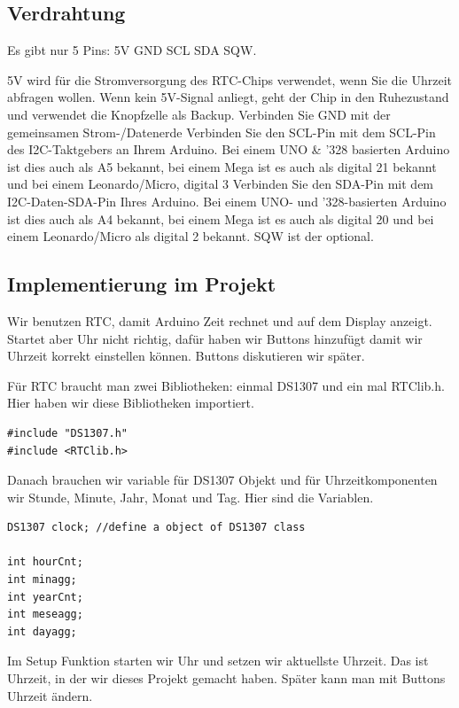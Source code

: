 \documentclass[conference]{IEEEtran}
\begin{document}
\subsection{Verdrahtung}

Es gibt nur 5 Pins: 5V GND SCL SDA SQW.

5V wird für die Stromversorgung des RTC-Chips verwendet, wenn Sie die Uhrzeit abfragen wollen. Wenn kein 5V-Signal anliegt, geht der Chip in den Ruhezustand und verwendet die Knopfzelle als Backup.
Verbinden Sie GND mit der gemeinsamen Strom-/Datenerde
Verbinden Sie den SCL-Pin mit dem SCL-Pin des I2C-Taktgebers an Ihrem Arduino. Bei einem UNO \& '328 basierten Arduino ist dies auch als A5 bekannt, bei einem Mega ist es auch als digital 21 bekannt und bei einem Leonardo/Micro, digital 3
Verbinden Sie den SDA-Pin mit dem I2C-Daten-SDA-Pin Ihres Arduino. Bei einem UNO- und '328-basierten Arduino ist dies auch als A4 bekannt, bei einem Mega ist es auch als digital 20 und bei einem Leonardo/Micro als digital 2 bekannt.
SQW ist der optional.

\subsection{Implementierung im Projekt}
Wir benutzen RTC, damit Arduino Zeit rechnet und auf dem Display anzeigt. Startet aber Uhr nicht richtig, dafür haben wir Buttons hinzufügt damit wir Uhrzeit korrekt einstellen können. Buttons diskutieren wir später. 

Für RTC braucht man zwei Bibliotheken: einmal DS1307 und ein mal RTClib.h. Hier haben wir diese Bibliotheken importiert. 

\begin{lstlisting}[style=CStyle]
#include "DS1307.h"
#include <RTClib.h>
\end{lstlisting}\textbf{}

Danach brauchen wir variable für DS1307 Objekt und für Uhrzeitkomponenten wir Stunde, Minute, Jahr, Monat und Tag. Hier sind die Variablen.

\begin{lstlisting}[style=CStyle]
DS1307 clock; //define a object of DS1307 class

int hourCnt;
int minagg;
int yearCnt;
int meseagg;
int dayagg;
\end{lstlisting}\textbf{}

Im Setup Funktion starten wir Uhr und setzen wir aktuellste Uhrzeit. Das ist Uhrzeit, in der wir dieses Projekt gemacht haben. Später kann man mit Buttons Uhrzeit ändern. 
\end{document}
